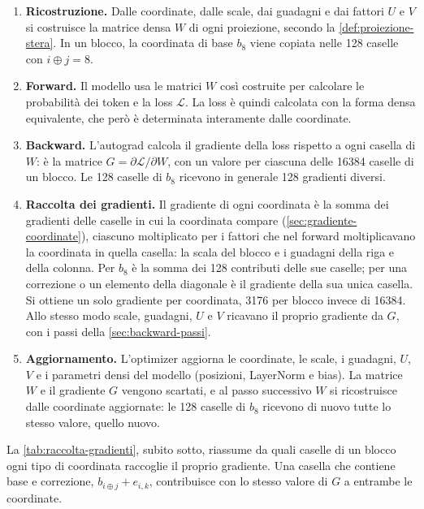 \begin{enumerate}
\item \textbf{Ricostruzione.} Dalle coordinate, dalle scale, dai guadagni e dai fattori $U$ e $V$ si costruisce la matrice densa $W$ di ogni proiezione, secondo la \autoref{def:proiezione-stera}. In un blocco, la coordinata di base $b_8$ viene copiata nelle 128 caselle con $i\oplus j=8$.
\item \textbf{Forward.} Il modello usa le matrici $W$ così costruite per calcolare le probabilità dei token e la loss $\mathcal L$. La loss è quindi calcolata con la forma densa equivalente, che però è determinata interamente dalle coordinate.
\item \textbf{Backward.} L'autograd calcola il gradiente della loss rispetto a ogni casella di $W$: è la matrice $G=\partial\mathcal L/\partial W$, con un valore per ciascuna delle \num{16384} caselle di un blocco. Le 128 caselle di $b_8$ ricevono in generale 128 gradienti diversi.
\item \textbf{Raccolta dei gradienti.} Il gradiente di ogni coordinata è la somma dei gradienti delle caselle in cui la coordinata compare (\autoref{sec:gradiente-coordinate}), ciascuno moltiplicato per i fattori che nel forward moltiplicavano la coordinata in quella casella: la scala del blocco e i guadagni della riga e della colonna. Per $b_8$ è la somma dei 128 contributi delle sue caselle; per una correzione o un elemento della diagonale è il gradiente della sua unica casella. Si ottiene un solo gradiente per coordinata, \num{3176} per blocco invece di \num{16384}. Allo stesso modo scale, guadagni, $U$ e $V$ ricavano il proprio gradiente da $G$, con i passi della \autoref{sec:backward-passi}.
\item \textbf{Aggiornamento.} L'optimizer aggiorna le coordinate, le scale, i guadagni, $U$, $V$ e i parametri densi del modello (posizioni, LayerNorm e bias). La matrice $W$ e il gradiente $G$ vengono scartati, e al passo successivo $W$ si ricostruisce dalle coordinate aggiornate: le 128 caselle di $b_8$ ricevono di nuovo tutte lo stesso valore, quello nuovo.
\end{enumerate}

La \autoref{tab:raccolta-gradienti}, subito sotto, riassume da quali caselle di un blocco ogni tipo di coordinata raccoglie il proprio gradiente. Una casella che contiene base e correzione, $b_{i\oplus j}+e_{i,k}$, contribuisce con lo stesso valore di $G$ a entrambe le coordinate.

